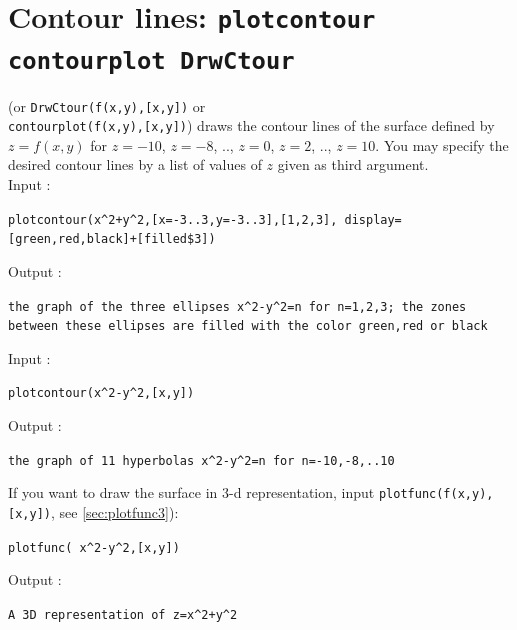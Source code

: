 \documentclass[a4paper,11pt]{book}
\begin{document}
\section{Contour lines: {\tt plotcontour contourplot DrwCtour}}\label{sec:plotcontour}
 (or {\tt DrwCtour(f(x,y),[x,y])} or \\
 {\tt contourplot(f(x,y),[x,y])})
draws the contour lines of the surface defined by $z=f(x,y)$ for $z=-10$, 
$z=-8$, .., $z=0$, $z=2$, .., $z=10$. You may specify the desired contour
lines by a list of values of $z$ given as third argument.\\
Input :
\begin{center}{\tt  plotcontour(x\verb|^|2+y\verb|^|2,[x=-3..3,y=-3..3],[1,2,3], display=[green,red,black]+[filled\$3])}\end{center}
Output :
\begin{center}{\tt  the graph of the three ellipses x\verb|^|2-y\verb|^|2=n for n=1,2,3; the zones between these ellipses are filled with the color green,red or black}\end{center}
Input :
\begin{center}{\tt  plotcontour(x\verb|^|2-y\verb|^|2,[x,y])}\end{center}
Output :
\begin{center}{\tt  the graph of 11 hyperbolas x\verb|^|2-y\verb|^|2=n for n=-10,-8,..10}\end{center}

If you want to draw the surface in 3-d representation, 
input {\tt plotfunc(f(x,y),[x,y])}, see \ref{sec:plotfunc3}):
\begin{center}{\tt plotfunc( x\verb|^|2-y\verb|^|2,[x,y])}\end{center}
Output :
\begin{center}{\tt A 3D representation of z=x\verb|^|2+y\verb|^|2}\end{center}
\end{document}

